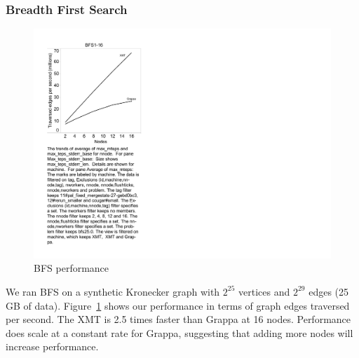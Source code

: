 \subsubsection{Breadth First Search}
\begin{figure}[tH]
\begin{center}
  \includegraphics[width=0.95\columnwidth]{figs/bfs_performance}
\begin{minipage}{0.95\columnwidth}
  \caption{\label{fig:bfs-performance} BFS performance}
\end{minipage}
\vspace{-3ex}
\end{center}
\end{figure}

We ran BFS on a synthetic Kronecker graph with $2^{25}$ vertices and
$2^{29}$ edges (25 GB of data). Figure~\ref{fig:bfs-performance} shows
our performance in terms of graph edges traversed per second. The XMT
is 2.5 times faster than Grappa at 16 nodes.  Performance does scale at a constant rate for Grappa, suggesting that adding more nodes will increase performance.

